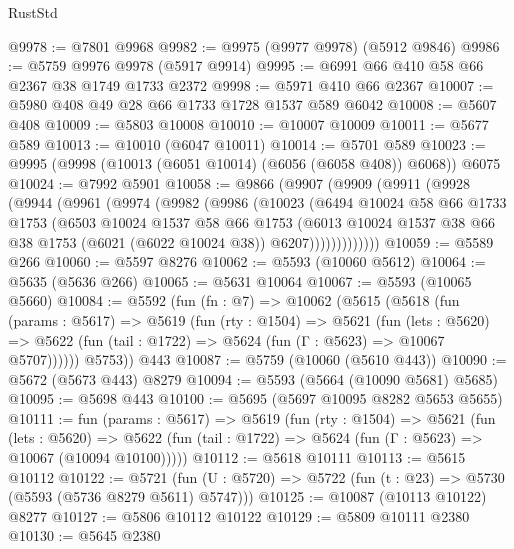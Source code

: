 \begin{lexlean}{RustStd}
\begin{coremodule}
@9978 := @7801 @9968
@9982 := @9975 (@9977 @9978) (@5912 @9846)
@9986 := @5759 @9976 @9978 (@5917 @9914)
@9995 := @6991 @66 @410 @58 @66 @2367 @38 @1749 @1733 @2372
@9998 := @5971 @410 @66 @2367
@10007 := @5980 @408 @49 @28 @66 @1733 @1728 @1537 @589 @6042
@10008 := @5607 @408
@10009 := @5803 @10008
@10010 := @10007 @10009
@10011 := @5677 @589
@10013 := @10010 (@6047 @10011)
@10014 := @5701 @589
@10023 := @9995 (@9998 (@10013 (@6051 @10014) (@6056 (@6058 @408)) @6068)) @6075
@10024 := @7992 @5901
@10058 := @9866
    (@9907
      (@9909
        (@9911
          (@9928
            (@9944
              (@9961
                (@9974
                  (@9982
                    (@9986
                      (@10023
                        (@6494
                          @10024
                          @58
                          @66
                          @1733
                          @1753
                          (@6503
                            @10024
                            @1537
                            @58
                            @66
                            @1753
                            (@6013
                              @10024
                              @1537
                              @38
                              @66
                              @38
                              @1753
                              (@6021 (@6022 @10024 @38))
                              @6207)))))))))))))
@10059 := @5589 @266
@10060 := @5597 @8276
@10062 := @5593 (@10060 @5612)
@10064 := @5635 (@5636 @266)
@10065 := @5631 @10064
@10067 := @5593 (@10065 @5660)
@10084 := @5592
    (fun (fn : @7) =>
    @10062
      (@5615
        (@5618
          (fun (params : @5617) =>
          @5619
            (fun (rty : @1504) =>
            @5621
              (fun (lets : @5620) =>
              @5622 (fun (tail : @1722) => @5624 (fun (Γ : @5623) => @10067 @5707))))))
        @5753))
    @443
@10087 := @5759 (@10060 (@5610 @443))
@10090 := @5672 (@5673 @443) @8279
@10094 := @5593 (@5664 (@10090 @5681) @5685)
@10095 := @5698 @443
@10100 := @5695 (@5697 @10095 @8282 @5653 @5655)
@10111 := fun (params : @5617) =>
  @5619
    (fun (rty : @1504) =>
    @5621
      (fun (lets : @5620) =>
      @5622 (fun (tail : @1722) => @5624 (fun (Γ : @5623) => @10067 (@10094 @10100)))))
@10112 := @5618 @10111
@10113 := @5615 @10112
@10122 := @5721
    (fun (U : @5720) => @5722 (fun (t : @23) => @5730 (@5593 (@5736 @8279 @5611) @5747)))
@10125 := @10087 (@10113 @10122) @8277
@10127 := @5806 @10112 @10122
@10129 := @5809 @10111 @2380
@10130 := @5645 @2380

\end{coremodule}
\end{lexlean}
